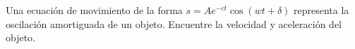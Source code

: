 \item Una ecuación de movimiento de la forma $s = Ae^{-ct} \cos(wt + \delta)$ representa la oscilación amortiguada de un objeto. Encuentre la velocidad y aceleración del objeto.
